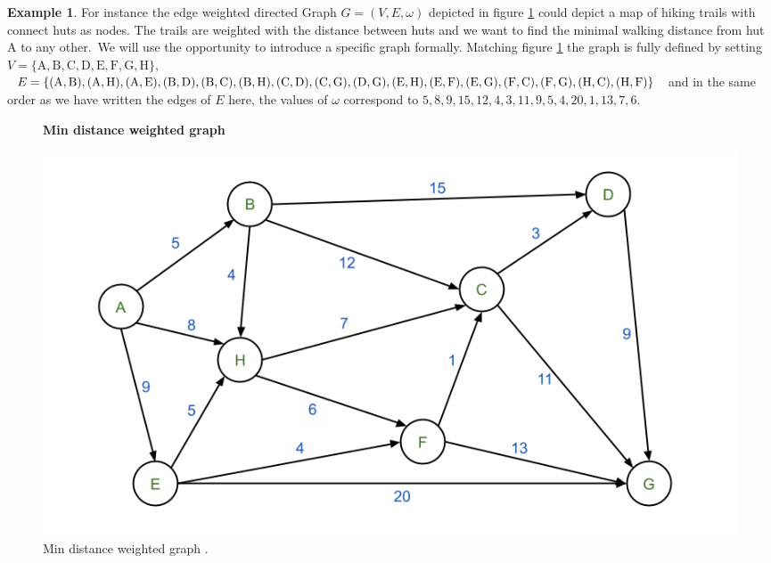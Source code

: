 \documentclass{article}
\theoremstyle{definition}
\newtheorem{example}[theorem]{Example}
\newcommand*{\figuretitle}[1]{%
    {\centering%
    \textbf{#1}%
    \par\medskip}%
}
\begin{document}
\begin{example}
For instance the edge weighted directed Graph $G = (V, E, \omega)$ depicted in figure \ref{fig:mindDistGraph} could depict a map of hiking trails with connect huts as nodes. The trails are weighted with the distance between huts and we want to find the minimal walking distance from hut A to any other.\
We will use the opportunity to introduce a specific graph formally. Matching figure \ref{fig:mindDistGraph} the graph is fully defined by setting $V=\{\text{A}, \text{B}, \text{C}, \text{D}, \text{E}, \text{F}, \text{G}, \text{H}\}$, $E=\{(\text{A}, \text{B}), (\text{A}, \text{H}), (\text{A}, \text{E}), (\text{B}, \text{D}), \\ (\text{B}, \text{C}), (\text{B}, \text{H}), (\text{C}, \text{D}), (\text{C}, \text{G}), (\text{D}, \text{G}), (\text{E}, \text{H}), (\text{E}, \text{F}), (\text{E}, \text{G}), (\text{F}, \text{C}), (\text{F}, \text{G}), (\text{H}, \text{C}), \\ (\text{H}, \text{F})\}$ and in the same order as we have written the edges of $E$ here, the values of $\omega$ correspond to $5, 8, 9, 15, 12, 4, 3, 11, 9, 5, 4, 20, 1, 13, 7, 6$.

\begin{figure}[H]
\centering
\figuretitle{Min distance weighted graph}
\includegraphics[scale=0.8]{graphics/weighted_directed_graph_2.png}
\caption{Min distance weighted graph \cite{dijacGraph20}.}
\label{fig:mindDistGraph}
\end{figure}


\end{example}
\end{document}
